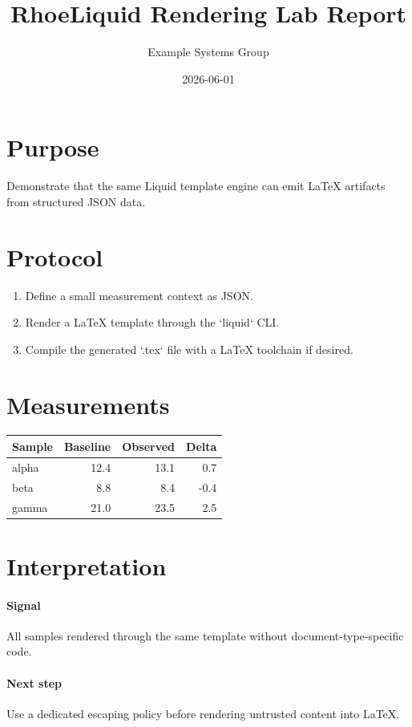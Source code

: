 \documentclass[11pt]{article}
\title{ RhoeLiquid Rendering Lab Report }
\author{ Example Systems Group }
\date{ 2026-06-01 }
\begin{document}
\maketitle

\section*{Purpose}
Demonstrate that the same Liquid template engine can emit LaTeX artifacts from structured JSON data.

\section*{Protocol}
\begin{enumerate}

  \item Define a small measurement context as JSON.

  \item Render a LaTeX template through the `liquid` CLI.

  \item Compile the generated `.tex` file with a LaTeX toolchain if desired.

\end{enumerate}

\section*{Measurements}
\begin{tabular}{lrrr}
\toprule
Sample & Baseline & Observed & Delta \\
\midrule

alpha & 12.4 & 13.1 & 0.7 \\

beta & 8.8 & 8.4 & -0.4 \\

gamma & 21.0 & 23.5 & 2.5 \\

\bottomrule
\end{tabular}

\section*{Interpretation}

\paragraph{ Signal } All samples rendered through the same template without document-type-specific code.

\paragraph{ Next step } Use a dedicated escaping policy before rendering untrusted content into LaTeX.
\end{document}
